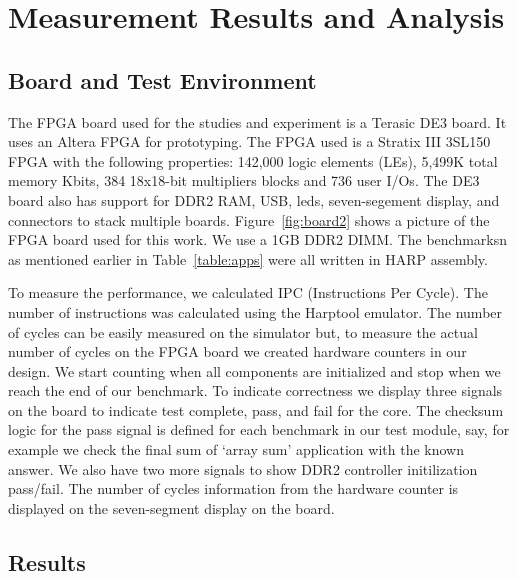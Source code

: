 \setcounter{equation}{0}
 
\chapter{Measurement Results and Analysis}
\label{chap: Simulation Results }
\section{Board and Test Environment}

The FPGA board used for the studies and experiment is a Terasic DE3 board. It uses an Altera FPGA for prototyping. The FPGA used is a Stratix III 3SL150 FPGA with the following properties: 142,000 logic elements (LEs), 5,499K total memory Kbits, 384 18x18-bit multipliers blocks and 736 user I/Os. The DE3 board also has support for DDR2 RAM, USB, leds, seven-segement display, and connectors to stack multiple boards. Figure~\ref{fig:board2} shows a picture of the FPGA board used for this work. We use a 1GB DDR2 DIMM. The benchmarksn as mentioned earlier in Table~\ref{table:apps} were all written in HARP assembly.

To measure the performance, we calculated IPC (Instructions Per Cycle). The number of instructions was calculated using the Harptool emulator. The number of cycles can be easily measured on the simulator but, to measure the actual number of cycles on the FPGA board we created hardware counters in our design. We start counting when all components are initialized and stop when we reach the end of our benchmark. To indicate correctness we display three signals on the board to indicate test complete, pass, and fail for the core. The checksum logic for the pass signal is defined for each benchmark in our test module, say, for example we check the final sum of `array sum' application with the known answer. We also have two more signals to show DDR2 controller initilization pass/fail. The number of cycles information from the hardware counter is displayed on the seven-segment display on the board.
\section{Results}

